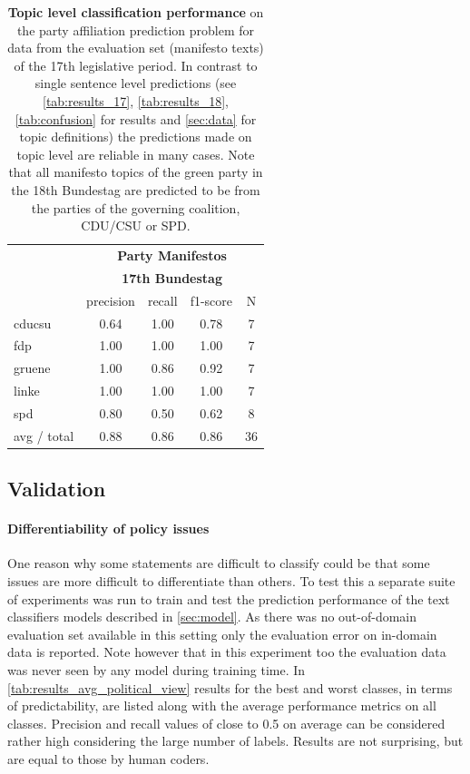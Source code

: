 \documentclass{article}
\begin{document}
\begin{table}[t]
\caption{
\label{tab:results_topic}
{\bf Topic level classification performance} on the party affiliation prediction problem for data from the evaluation set (manifesto texts) of the 17th legislative period. In contrast to single sentence level predictions (see \autoref{tab:results_17}, \autoref{tab:results_18}, \autoref{tab:confusion} for results and \autoref{sec:data} for topic definitions) the predictions made on topic level are reliable in many cases. Note that all manifesto topics of the green party in the 18th Bundestag are predicted to be from the parties of the governing coalition, CDU/CSU or SPD.}
\begin{center}
\begin{tabular}{lcccc}
& \multicolumn{4}{c}{\bf Party Manifestos} \\
& \multicolumn{4}{c}{\bf 17th Bundestag} \\
    &         precision    &recall &  f1-score  & N  \\
    \hline
        \hline
cducsu     &  0.64  &    1.00  &    0.78    &     7\\
       fdp    &   1.00    &  1.00    &  1.00    &     7\\
    gruene  &     1.00  &    0.86  &    0.92    &     7\\
     linke    &   1.00   &   1.00     & 1.00    &     7\\
       spd   &    0.80   &   0.50    &  0.62     &    8\\
    \hline
    avg / total  &     0.88   &   0.86   &   0.86  &      36\\
\end{tabular}
\end{center}

\end{table}

\subsection{Validation}
\paragraph{Differentiability of policy issues}
One reason why some statements are difficult to classify could be that some issues are more difficult to differentiate than others. To test this a separate suite of experiments was run to train and test the prediction performance of the text classifiers models described in \autoref{sec:model}. As there was no out-of-domain evaluation set available in this setting only the evaluation error on in-domain data is reported. Note however that in this experiment too the evaluation data was never seen by any model during training time.
In \autoref{tab:results_avg_political_view} results for the best and worst classes, in terms of predictability, are listed along with the average performance metrics on all classes.
Precision and recall values of close to 0.5 on average can be considered rather high considering the large number of labels. Results are not surprising, but are equal to those by human coders. \\
\end{document}
